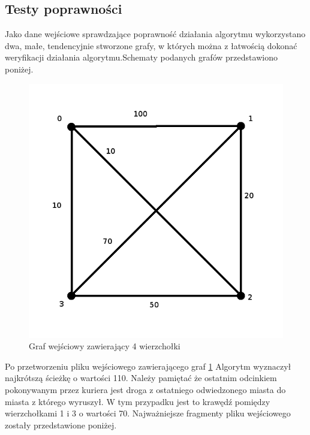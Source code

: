 \documentclass[10pt,a4paper]{article}
\begin{document}
\subsection{Testy poprawności}
Jako dane wejściowe sprawdzające poprawność działania algorytmu wykorzystano dwa, małe, tendencyjnie stworzone grafy, w których można z łatwością dokonać weryfikacji działania algorytmu.Schematy podanych grafów przedstawiono poniżej.

\begin{figure}[H]
\includegraphics[scale=0.5]{mapa4.png}
\centering
\caption{\label{graph4}Graf wejściowy zawierający 4 wierzchołki}
\end{figure}
Po przetworzeniu pliku wejściowego zawierającego graf \ref{graph4} Algorytm wyznaczył najkrótszą ścieżkę o wartości 110. Należy pamiętać że ostatnim odcinkiem pokonywanym przez kuriera jest droga z ostatniego odwiedzonego miasta do miasta z którego wyruszył. W tym przypadku jest to krawędź pomiędzy wierzchołkami 1 i 3 o wartości 70. Najważniejsze fragmenty pliku wejściowego zostały przedstawione poniżej. 
\end{document}
